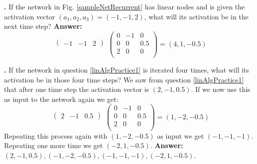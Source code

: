 \noindent
{}
{\bf \theLinearAlgebraCounter.}  If the network in Fig. \ref{sampleNetRecurrent} has linear nodes and is given the activation vector $(a_1,a_2,a_3) = (-1,-1,2)$, what will its activation be in the next time step?
{\bf Answer:} 
\[
  \begin{matrix}\begin{pmatrix}-1 & -1 & 2\end{pmatrix}\\\mbox{}\end{matrix}
 \begin{pmatrix}
 0  &   -1 & 0 \\
 0  &   0 & 0.5 \\
 2  &   0 & 0 \\
\end{pmatrix}
  =  (4,1,-0.5)
\]
\bigskip


\noindent
{}
{\bf \theLinearAlgebraCounter.}  If the network in question \ref{linAlgPractice1} is iterated four times, what will its activation be in those four time steps?
We saw from question \ref{linAlgPractice1} that after one time step the activation vector is $(2,-1,0.5)$. If we now use this as input to the network again we get:
\[
  \begin{matrix}
  \begin{pmatrix}2 & -1 & 0.5
  \end{pmatrix}\\\mbox{}
 \end{matrix}
 \begin{pmatrix}
 0  &   -1 & 0 \\
 0  &   0 & 0.5 \\
 2  &   0 & 0 \\
\end{pmatrix}
  =  (1,-2,-0.5)
\]
Repeating this process again with $(1,-2,-0.5)$ as input we get $(-1,-1,-1)$. Repeating one more time we get $(-2,1,-0.5)$.
{\bf Answer:}  $(2,-1,0.5),(-1,-2,-0.5),(-1,-1,-1),(-2,1,-0.5)$.
\bigskip
